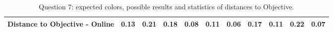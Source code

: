 \begin{table}[H]
{\begin{tabular}{lccccccccccccc}
    \multicolumn{4}{l}{Distance to Objective - Online}                                                                                               & \multicolumn{1}{|c}{0.13}        & \multicolumn{1}{c|}{0.21}    & \multicolumn{1}{|c}{0.18}        & \multicolumn{1}{c|}{0.08}    & \multicolumn{1}{|c}{\textbf{0.11}}       & \multicolumn{1}{c|}{0.06}    & \multicolumn{1}{|c}{0.17}        & \multicolumn{1}{c|}{0.11}    & \multicolumn{1}{|c}{0.22}       & \multicolumn{1}{c|}{0.07}    \\ \hline
    \end{tabular}}
  \caption[Question 7, with expected Results.]{Question 7: expected colors, possible results and statistics of distances to Objective.}
  \vspace{-5pt}
  \label{table:lab_q7_expected}
\end{table}
%
